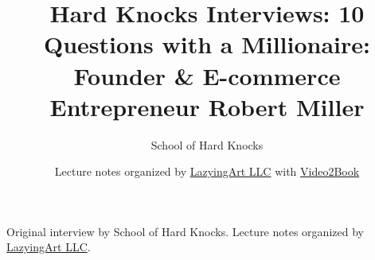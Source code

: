 \documentclass[11pt,oneside]{book}
\begin{document}
\frontmatter
\title{Hard Knocks Interviews: 10 Questions with a Millionaire: Founder \& E-commerce Entrepreneur Robert Miller}
\author{School of Hard Knocks}
\date{Lecture notes organized by \href{https://lazying.art}{LazyingArt LLC} with \href{https://github.com/lachlanchen/Video2Book}{Video2Book}}
\maketitle
\begin{center}
\small Original interview by School of Hard Knocks. Lecture notes organized by \href{https://lazying.art}{LazyingArt LLC}.
\end{center}
\clearpage
\mainmatter

\end{document}
